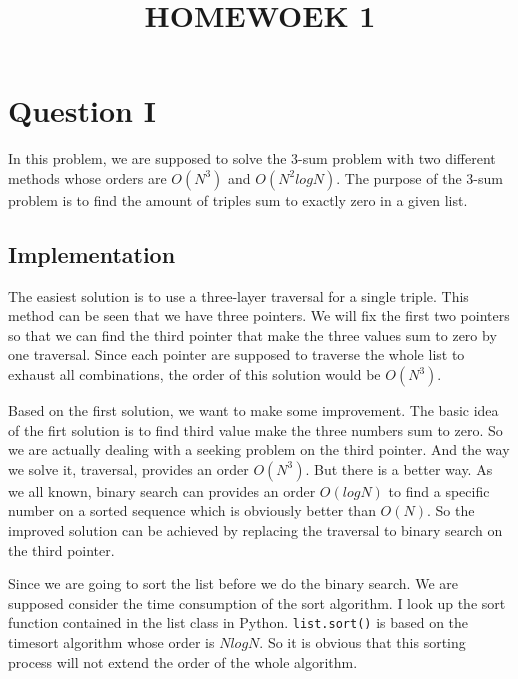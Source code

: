 \documentclass[conference]{IEEEtran}
\begin{document}
\title{HOMEWOEK 1}

\author{
}

\maketitle

\section*{Question I}

In this problem, we are supposed to solve the 3-sum problem with two different methods
whose orders are $O(N^3)$ and $O(N^2logN)$.
The purpose of the 3-sum problem is to find the amount of triples sum to exactly zero in 
a given list.

\subsection*{Implementation}

The easiest solution is to use a three-layer traversal for a single triple. This method can
be seen that we have three pointers. We will fix the first two pointers so that we can find 
the third pointer that make the three values sum to zero by one traversal. Since each pointer
are supposed to traverse the whole list to exhaust all combinations, the order of this 
solution would be $O(N^3)$.

Based on the first solution, we want to make some improvement. The basic idea of the firt 
solution is to find third value make the three numbers sum to zero. So we are actually 
dealing with a seeking problem on the third pointer. And the way we solve it, traversal, 
provides an order $O(N^3)$. But there is a better way. As we all known, binary search can 
provides an order $O(logN)$ to find a specific number on a sorted sequence which is obviously
better than $O(N)$. So the improved solution can be achieved by replacing the traversal to 
binary search on the third pointer. 

Since we are going to sort the list before we do the binary search. We are supposed consider 
the time consumption of the sort algorithm. I look up the sort function contained in the list 
class in Python. \verb|list.sort()| is based on the timesort algorithm whose order is $NlogN$.
So it is obvious that this sorting process will not extend the order of the whole algorithm.
\end{document}

